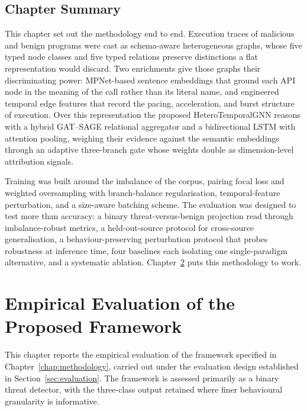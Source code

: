 \documentclass[%
    BCOR=10mm,
    DIV=13,
    toc=bibliography,
    toc=listof,
    oneside,
    12pt,
]{scrbook}
\begin{document}
\section{Chapter Summary}
\label{sec:methodology_summary}

This chapter set out the methodology end to end. Execution traces of malicious
and benign programs were cast as schema-aware heterogeneous graphs, whose five
typed node classes and five typed relations preserve distinctions a flat
representation would discard. Two enrichments give those graphs their
discriminating power: MPNet-based sentence embeddings that ground each API node
in the meaning of the call rather than its literal name, and engineered temporal
edge features that record the pacing, acceleration, and burst structure of
execution. Over this representation the proposed HeteroTemporalGNN reasons with
a hybrid GAT--SAGE relational aggregator and a bidirectional LSTM with attention
pooling, weighing their evidence against the semantic embeddings through an
adaptive three-branch gate whose weights double as dimension-level attribution
signals.

Training was built around the imbalance of the corpus, pairing focal loss and
weighted oversampling with branch-balance regularisation, temporal-feature
perturbation,
and a size-aware batching scheme. The evaluation was designed to test more than
accuracy: a binary threat-versus-benign projection read through imbalance-robust
metrics, a held-out-source protocol for cross-source generalisation, a
behaviour-preserving perturbation protocol that probes robustness at inference
time, four baselines each isolating one single-paradigm alternative, and a
systematic ablation. Chapter~\ref{chap:results} puts this methodology to work.

\chapter{Empirical Evaluation of the Proposed Framework}
\label{chap:results}

This chapter reports the empirical evaluation of the framework specified in
Chapter~\ref{chap:methodology}, carried out under the evaluation design
established in Section~\ref{sec:evaluation}. The framework is assessed
primarily as a binary threat detector, with the three-class output retained
where finer behavioural granularity is informative.
\end{document}
